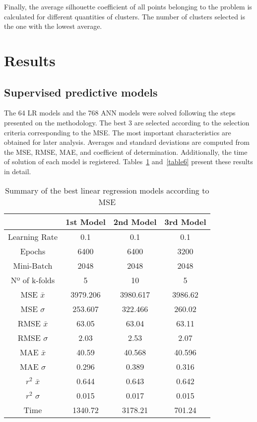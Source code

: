\documentclass[conference]{IEEEtran}
\begin{document}
Finally, the average silhouette coefficient of all points belonging to the problem is calculated for different quantities of clusters. The number of clusters selected is the one with the lowest average.  

\section{Results}

\subsection{Supervised predictive models}

The 64 LR models and the 768 ANN models were solved following the steps presented on the methodology. The best 3 are selected according to the selection criteria corresponding to the MSE. The most important characteristics are obtained for later analysis. Averages and standard deviations are computed from the MSE, RMSE, MAE, and coefficient of determination. Additionally, the time of solution of each model is registered. Tables~\ref{table5} and~\ref{table6} present these results in detail.

\begin{table}[!ht]
\renewcommand{\arraystretch}{1.3}
\caption{Summary of the best linear regression models according to MSE}
\label{table5}
\centering
\begin{tabular}{c || c || c || c }
\hline
\bfseries 		 & \bfseries 1st Model 	& \bfseries 2nd Model 	& \bfseries 3rd Model  	\\

\hline\hline

Learning Rate				&	0.1		&	0.1		&	0.1		\\
Epochs					&	6400		&	6400		&	3200		\\
Mini-Batch				&	2048		&	2048		&	2048		\\
Nº of k-folds				&	5		&	10		&	5		\\
MSE $\bar{x}$				&	3979.206  &	3980.617	&	3986.62	\\
MSE	$\sigma$				&	253.607	&	322.466	&	260.02	\\
RMSE $\bar{x}$			&	63.05	&	63.04	&	63.11	\\
RMSE $\sigma$			&	2.03		&	2.53		&	2.07		\\
MAE $\bar{x}$				&	40.59	&	40.568	&	40.596	\\
MAE $\sigma$				&	0.296	&	0.389	&	0.316	\\
$r^{2}$  $\bar{x}$			&	0.644	&	0.643	&	0.642	\\
$r^{2}$ $\sigma$			&	0.015	&	0.017	&	0.015	\\
Time						&	1340.72	&	3178.21	&	701.24	\\

\hline
\end{tabular}
\end{table}
\end{document}
